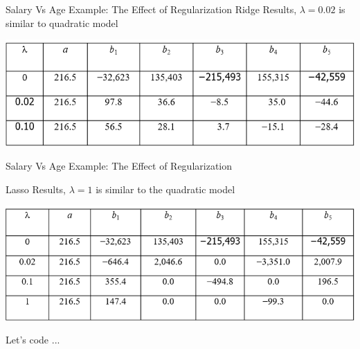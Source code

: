 \documentclass[11pt]{beamer}
\begin{document}
\begin{frame}{Salary Vs Age Example: The Effect of Regularization}
Ridge Results, $\lambda=0.02$ is similar to quadratic model
	\begin{center}
	\includegraphics[scale=.55]{../05-pictures/lesson-2-1_pic_19.png}
	\end{center}
\end{frame}
\begin{frame}{Salary Vs Age Example: The Effect of Regularization}

Lasso Results, $\lambda=1$ is similar to the quadratic model

	\begin{center}
	\includegraphics[scale=.5]{../05-pictures/lesson-2-1_pic_20.png}
	\end{center}
\end{frame}
\begin{frame}{Let's code ...}
\end{frame}
\end{document}
